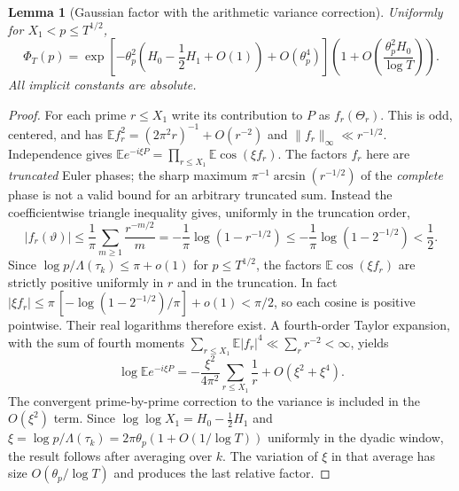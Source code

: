 \documentclass[11pt,reqno]{amsart}
\numberwithin{equation}{section}
\newtheorem{lemma}[theorem]{Lemma}
\begin{document}
\begin{lemma}[Gaussian factor with the arithmetic variance correction]
\label{lem:profile}
Uniformly for $X_1<p\le T^{1/2}$,
\begin{equation}\label{eq:profileasymp}
\Phi_T(p)
=\exp\left[-\theta_p^2
\left(H_0-\frac12H_1+O(1)\right)+O(\theta_p^4)\right]
\left(1+O\left(\frac{\theta_p^2H_0}{\log T}\right)\right).
\end{equation}
All implicit constants are absolute.
\end{lemma}
\begin{proof}
For each prime $r\le X_1$ write its contribution to
$P$ as $f_r(\Theta_r)$.  This is odd, centered, and has
$\mathbb E f_r^2=(2\pi^2r)^{-1}+O(r^{-2})$ and
$\|f_r\|_\infty\ll r^{-1/2}$.  Independence gives
$\mathbb E e^{-i\xi P}=\prod_{r\le X_1}\mathbb E\cos(\xi f_r)$.
The factors $f_r$ here are \emph{truncated} Euler phases; the
sharp maximum $\pi^{-1}\arcsin(r^{-1/2})$ of the \emph{complete}
phase is not a valid bound for an arbitrary truncated sum.
Instead the coefficientwise triangle inequality gives, uniformly in
the truncation order,
\begin{equation}\label{eq:truncatedphasebound}
 |f_r(\vartheta)|\le\frac1\pi\sum_{m\ge1}
 \frac{r^{-m/2}}m
 =-\frac1\pi\log(1-r^{-1/2})
 \le-\frac1\pi\log(1-2^{-1/2})<\frac12.
\end{equation}
Since $\log p/\Lambda(\tau_k)\le\pi+o(1)$ for
$p\le T^{1/2}$, the factors $\mathbb E\cos(\xi f_r)$
are strictly positive uniformly in $r$ and in the truncation.
In fact $|\xi f_r|\le\pi\,[-\log(1-2^{-1/2})/\pi]+o(1)
<\pi/2$, so each cosine is positive pointwise.
Their real logarithms therefore exist.
A fourth-order Taylor expansion, with the sum of fourth moments
$\sum_{r\le X_1}\mathbb E|f_r|^4\ll\sum_r r^{-2}<\infty$,
yields
\[
\log\mathbb E e^{-i\xi P}
=-\frac{\xi^2}{4\pi^2}\sum_{r\le X_1}\frac1r
 +O(\xi^2+\xi^4).
\]
The convergent prime-by-prime correction to the variance is
included in the $O(\xi^2)$ term.  Since
$\log\log X_1=H_0-\frac12H_1$ and
$\xi=\log p/\Lambda(\tau_k)
=2\pi\theta_p(1+O(1/\log T))$
uniformly in the dyadic window, the result follows after averaging
over $k$.  The variation of $\xi$ in that average has size
$O(\theta_p/\log T)$ and produces the last relative factor.
\end{proof}
\end{document}
